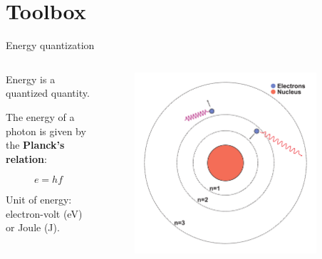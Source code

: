 \section{Toolbox}

\begin{frame}{Energy quantization}

    \begin{columns}[c, onlytextwidth]

        \begin{column}{0.4\textwidth}

            Energy is a quantized quantity.

            The energy of a photon is given by the \textbf{Planck's relation}:

            \begin{equation}
                e = h f
            \end{equation}

            Unit of energy: electron-volt (eV) or Joule (J).

        \end{column}

        \begin{column}{0.6\textwidth}

            \begin{figure}
                \centering
                \includegraphics[width=0.9\textwidth]{pdf/eletronic-structure.pdf}
            \end{figure}


\end{column}
\end{columns}
\end{frame}
